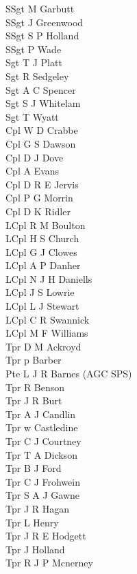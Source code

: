 \begin{multicols}{3}
  \small
  \noindent
  SSgt M Garbutt \\
  SSgt J Greenwood \\
  SSgt S P Holland \\
  SSgt P Wade \\
  Sgt T J Platt \\
  Sgt R Sedgeley \\
  Sgt A C Spencer \\
  Sgt S J Whitelam \\
  Sgt T Wyatt \\
  Cpl W D Crabbe \\
  Cpl G S Dawson \\
  Cpl D J Dove \\
  Cpl A Evans \\
  Cpl D R E Jervis \\
  Cpl P G Morrin \\
  Cpl D K Ridler \\
  LCpl R M Boulton \\
  LCpl H S Church \\
  LCpl G J Clowes \\
  LCpl A P Danher \\
  LCpl N J H Daniells \\
  LCpl J S Lowrie \\
  LCpl L J Stewart \\
  LCpl C R Swannick \\
  LCpl M F Williams \\
  Tpr D M Ackroyd \\
  Tpr p Barber \\
  Pte L J R Barnes (AGC SPS) \\
  Tpr R Benson \\
  Tpr J R Burt \\
  Tpr A J Candlin \\
  Tpr w Castledine \\
  Tpr C J Courtney \\
  Tpr T A Dickson \\
  Tpr B J Ford \\
  Tpr C J Frohwein \\
  Tpr S A J Gawne \\
  Tpr J R Hagan \\
  Tpr L Henry \\
  Tpr J R E Hodgett \\
  Tpr J Holland \\
  Tpr R J P Mcnerney \\

\end{multicols}
